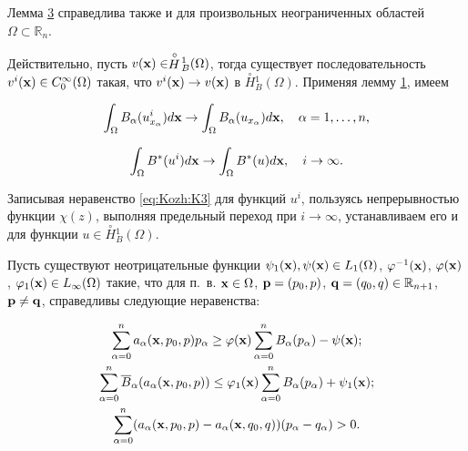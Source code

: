 \begin{remark}[2]

Лемма \hyperlink{kozh:lemma3}{3} справедлива также и для произвольных не\-ог\-ра\-ниченных областей $\Omega\subset\mathbb{R}_n$.

Действительно, пусть $v({\bf x})\in\stackrel {\circ}{H}\!_{B}^1(\Omega)$, тогда существует последовательность $v^i({\bf x})\in C_0^\infty(\Omega)$ такая, что $v^i({\bf x}) \to  v({\bf x})$ в $\stackrel {\circ}{H}\!_{B}^1(\Omega)$. Применяя лемму \hyperlink{kozh:lemma1}{1}, имеем

$$\int_{\Omega}B_{\alpha}(u^i_{x_{\alpha}})d{\bf x} \to \int_{\Omega}B_{\alpha}(u_{x_{\alpha}})d{\bf x},\quad \alpha=1,\ldots,n,$$

$$ \int_{\Omega}B^*(u^i)d{\bf x} \to  \int_{\Omega}B^*(u)d{\bf x},\quad i \to \infty.$$

  Записывая неравенство \eqref{eq:Kozh:K3} для функций $u^i$, пользуясь непрерывностью    функции $\chi(z)$,  выполняя предельный переход при $i \to \infty$, устанавливаем его и для функции $u\in\stackrel {\circ}{H}\!_{B}^1(\Omega)$.

\end{remark}



\smallskip




Пусть  существуют неотрицательные функции $\psi_1({\bf x}),\psi({\bf x})\in L_1(\Omega)$, $\varphi^{-1}({\bf x})$, $\varphi({\bf x})$, $\varphi_1({\bf x})\in L_{\infty}(\Omega)$ такие, что  для п.~в.  ${\bf x}\in\Omega$, ${\bf p}=(p_0,p)$, ${\bf q}=(q_0,q)\in\mathbb{R}_{n+1}$, ${\bf p}\neq {\bf q}$, справедливы следующие неравенства:

\begin{gather}

\label{eq:Kozh:us1}

\sum_{\alpha=0}^na_{\alpha}({\bf x},p_0,p)p_\alpha\geq \varphi({\bf x})\sum_{\alpha=0}^nB_\alpha(p_\alpha)-\psi({\bf x});

\\

\label{eq:Kozh:us2}

 \sum_{\alpha=0}^n\overline{B}_\alpha(a_{\alpha}({\bf x},p_0,p))\leq \varphi_1({\bf x}) \sum_{\alpha=0}^n

B_\alpha(p_\alpha)+\psi_1({\bf x});

\\

\label{eq:Kozh:us4}

 \sum_{\alpha=0}^n (a_\alpha({\bf x},p_0,p)-a_\alpha({\bf x},q_0,q))(p_{\alpha}-q_{\alpha})> 0.

\end{gather}

